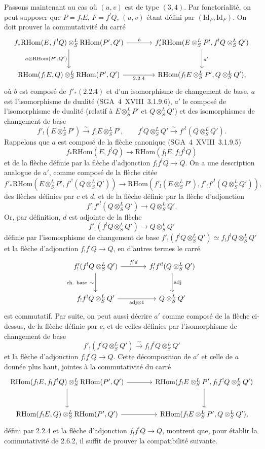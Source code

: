 \documentclass[11pt]{article}
\providecommand{\RHom}{\mathrm{RHom}}
\providecommand{\Id}{\mathrm{Id}}
\providecommand{\RHom}{\mathrm{RHom}}
\providecommand{\RHom}{\mathrm R\mathcal{H}om}
\begin{document}
Passons maintenant au cas où $(u,v)$ est de type $(3,4)$. Par fonctorialité, on peut supposer que $P=f_{!}E$, $F=f^{!}Q$, $(u,v)$ étant défini par $(\Id_P,\Id_F)$. On doit prouver la commutativité du carré
\[
\begin{tikzcd}[column sep=large,row sep=large]
f_*\RHom(E,f^!Q)\otimes^L_S\RHom(P',Q') \arrow[r,"b"] \arrow[d,"{a\otimes\RHom(P',Q')}"'] & f'_*\RHom(E\otimes^L_SP',f^!Q\otimes^L_SQ') \arrow[d,"a'"]\\
\RHom(f_!E,Q)\otimes^L_S\RHom(P',Q') \arrow[r,"2.2.4"'] & \RHom(f_!E\otimes^L_SP',Q\otimes^L_SQ'),
\end{tikzcd}
\]
où $b$ est composé de $f'_*(2.2.4)$ et d'un isomorphisme de changement de base, $a$ est l'isomorphisme de dualité (SGA~4~XVIII~3.1.9.6), $a'$ le composé de l'isomorphisme de dualité (relatif à $E\otimes^L_SP'$ et $Q\otimes^L_SQ'$) et des isomorphismes de changement de base
\[
f'_!(E\otimes^L_SP')\xrightarrow{\sim}f_!E\otimes^L_SP',
\qquad
f^!Q\otimes^L_SQ'\xrightarrow{\sim}f'^!(Q\otimes^L_SQ').
\]
Rappelons que $a$ est composé de la flèche canonique (SGA~4~XVIII~3.1.9.5)
\[
f_*\RHom(E,f^!Q)\longrightarrow\RHom(f_!E,f_!f^!Q)
\]
et de la flèche définie par la flèche d'adjonction $f_!f^!Q\to Q$. On a une description analogue de $a'$, comme composé de la flèche citée
\[
f'_*\RHom(E\otimes^L_SP',f'^!(Q\otimes^L_SQ'))\longrightarrow
\RHom(f'_!(E\otimes^L_SP'),f'_!f'^!(Q\otimes^L_SQ')),
\]
des flèches définies par $c$ et $d$, et de la flèche définie par la flèche d'adjonction
\[
f'_!f'^!(Q\otimes^L_SQ')\longrightarrow Q\otimes^L_SQ'.
\]
Or, par définition, $d$ est adjointe de la flèche
\[
f'_!(f^!Q\otimes^L_SQ')\longrightarrow Q\otimes^L_SQ'
\]
définie par l'isomorphisme de changement de base $f'_!(f^!Q\otimes^L_SQ')\simeq f_!f^!Q\otimes^L_SQ'$ et la flèche d'adjonction $f_!f^!Q\to Q$, en d'autres termes le carré
\[
\begin{tikzcd}[column sep=large,row sep=large]
f'_!(f^!Q\otimes^L_SQ') \arrow[r,"{f'_!d}"] \arrow[d,"{\text{ch. base}\ \sim}"'] & f'_!f'^!(Q\otimes^L_SQ') \arrow[d,"\mathrm{adj}"]\\
f_!f^!Q\otimes^L_SQ' \arrow[r,"{\mathrm{adj}\otimes 1}"'] & Q\otimes^L_SQ'
\end{tikzcd}
\]
est commutatif. Par suite, on peut aussi décrire $a'$ comme composé de la flèche ci-dessus, de la flèche définie par $c$, et de celles définies par l'isomorphisme de changement de base
\[
f'_!(f^!Q\otimes^L_SQ')\xrightarrow{\sim}f_!f^!Q\otimes^L_SQ'
\]
et la flèche d'adjonction $f_!f^!Q\to Q$. Cette décomposition de $a'$ et celle de $a$ donnée plus haut, jointes à la commutativité du carré
\[
\begin{tikzcd}[column sep=large,row sep=large]
\RHom(f_!E,f_!f^!Q)\otimes^L_S\RHom(P',Q') \arrow[r] \arrow[d] & \RHom(f_!E\otimes^L_SP',f_!f^!Q\otimes^L_SQ') \arrow[d]\\
\RHom(f_!E,Q)\otimes^L_S\RHom(P',Q') \arrow[r] & \RHom(f_!E\otimes^L_SP',Q\otimes^L_SQ'),
\end{tikzcd}
\]
défini par 2.2.4 et la flèche d'adjonction $f_!f^!Q\to Q$, montrent que, pour établir la commutativité de 2.6.2, il suffit de prouver la compatibilité suivante.
\end{document}
